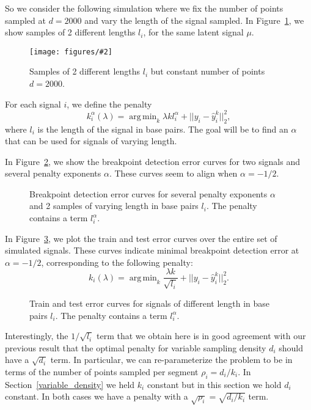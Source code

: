 \documentclass{jsfds} %
\newcommand{\fig}[3][H]{
  \begin{figure}[#1]
    \hskip -1cm
    
    \caption{#3}
    \label{fig:#2}
  \end{figure}
}
\newcommand{\figpdf}[3][H]{
  \begin{figure}[#1]
    \hskip -1cm
    \texttt{[image: figures/\#2]}
    \caption{#3}
    \label{fig:#2}
  \end{figure}
}
\DeclareMathOperator*{\argmin}{arg\,min}
\begin{document}
So we consider the following simulation where we fix the number of
points sampled at $d=2000$ and vary the length of the signal
sampled. In Figure~\ref{fig:variable-breaks-constant-size}, we show
samples of 2 different lengths $l_i$, for the same latent signal
$\mu$.

\figpdf{variable-breaks-constant-size}{Samples of 2 different lengths
  $l_i$ but constant number of points $d=2000$.}

\newpage

For each signal $i$, we define the penalty
\begin{equation}
  \label{eq:kstar_length}
  k_i^\alpha(\lambda) = \argmin_k \lambda k l_i^\alpha 
+ ||y_i - \hat y_i^k||^2_2,
\end{equation}
where $l_i$ is the length of the signal in base pairs. The goal will
be to find an $\alpha$ that can be used for signals of varying length.


In Figure~\ref{fig:variable-breaks-constant-size-berr}, we show
the breakpoint detection error curves for two signals and several
penalty exponents $\alpha$.
These curves seem to align when $\alpha=-1/2$.

\fig{variable-breaks-constant-size-berr}{Breakpoint detection error
  curves for several penalty exponents $\alpha$ and 2 samples of
  varying length in base pairs $l_i$. The penalty contains a term
  $l_i^\alpha$.}

\newpage

In Figure~\ref{fig:variable-breaks-constant-size-alpha}, we plot the
train and test error curves over the entire set of simulated signals.
These curves indicate minimal breakpoint detection error at
$\alpha=-1/2$, corresponding to the following penalty:
\begin{equation}
  \label{eq:kstar_length_opt}
  k_i(\lambda) = \argmin_k \frac{\lambda k}{\sqrt{l_i}}
  + ||y_i-\hat y_i^k||^2_2.
\end{equation}




\fig{variable-breaks-constant-size-alpha}{Train and test error curves
  for signals of different length in base pairs $l_i$. The penalty
  contains a term
  $l_i^\alpha$.}


Interestingly, the $1/\sqrt{l_i}$ term that we obtain here is in good
agreement with our previous result that the optimal penalty for
variable sampling density $d_i$ should have a $\sqrt{d_i}$ term. In
particular, we can re-parameterize the problem to be in terms of the
number of points sampled per segment $\rho_i=d_i/k_i$. In
Section~\ref{variable_density} we held $k_i$ constant but in this
section we hold $d_i$ constant. In both cases we have a penalty with a
$\sqrt{\rho_i}=\sqrt{d_i/k_i}$ term.
\end{document}
